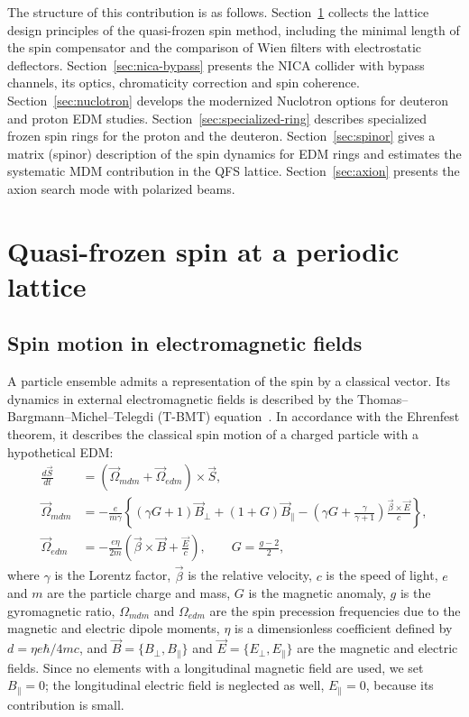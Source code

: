 \documentclass[%
  aps,
  pra,
  preprint,
  a4paper,
  amsmath,
  amssymb,
  floatfix,
  longbibliography,
  superscriptaddress
]{revtex4-2}
\begin{document}
The structure of this contribution is as follows. Section~\ref{sec:qfs}
collects the lattice design principles of the quasi-frozen spin method,
including the minimal length of the spin compensator and the comparison of
Wien filters with electrostatic deflectors. Section~\ref{sec:nica-bypass}
presents the NICA collider with bypass channels, its optics, chromaticity
correction and spin coherence. Section~\ref{sec:nuclotron} develops the
modernized Nuclotron options for deuteron and proton EDM studies.
Section~\ref{sec:specialized-ring} describes specialized frozen spin rings for
the proton and the deuteron. Section~\ref{sec:spinor} gives a matrix
(spinor) description of the spin dynamics for EDM rings and estimates the
systematic MDM contribution in the QFS lattice. Section~\ref{sec:axion}
presents the axion search mode with polarized beams.

\section{Quasi-frozen spin at a periodic lattice}
\label{sec:qfs}

\subsection{Spin motion in electromagnetic fields}

A particle ensemble admits a representation of the spin by a classical vector.
Its dynamics in external electromagnetic fields is described by the
Thomas--Bargmann--Michel--Telegdi (T-BMT)
equation~\cite{Bargmann:1959gz,Fukuyama:2013ioa}. In accordance with the
Ehrenfest theorem, it describes the classical spin motion of a charged particle
with a hypothetical EDM:
\begin{equation}
\begin{aligned}
  \frac{d\vec{S}}{dt} &= \left(\vec{\Omega}_{mdm} + \vec{\Omega}_{edm}\right)\times\vec{S},\\
  \vec{\Omega}_{mdm} &= -\frac{e}{m\gamma}\left\{(\gamma G+1)\vec{B}_{\perp}
     + (1+G)\vec{B}_{\parallel}
     - \left(\gamma G+\frac{\gamma}{\gamma+1}\right)\frac{\vec{\beta}\times\vec{E}}{c}\right\},\\
  \vec{\Omega}_{edm} &= -\frac{e\eta}{2m}\left(\vec{\beta}\times\vec{B}+\frac{\vec{E}}{c}\right),
  \qquad G = \frac{g-2}{2},
\end{aligned}
\label{eq:tbmt}
\end{equation}
where $\gamma$ is the Lorentz factor, $\vec{\beta}$ is the relative velocity,
$c$ is the speed of light, $e$ and $m$ are the particle charge and mass, $G$ is
the magnetic anomaly, $g$ is the gyromagnetic ratio, $\Omega_{mdm}$ and
$\Omega_{edm}$ are the spin precession frequencies due to the magnetic and
electric dipole moments, $\eta$ is a dimensionless coefficient defined by
$d = \eta e\hbar/4mc$, and $\vec{B}=\{B_\perp, B_\parallel\}$ and
$\vec{E}=\{E_\perp, E_\parallel\}$ are the magnetic and electric fields. Since
no elements with a longitudinal magnetic field are used, we set
$B_\parallel = 0$; the longitudinal electric field is neglected as well,
$E_\parallel = 0$, because its contribution is small.
\end{document}
